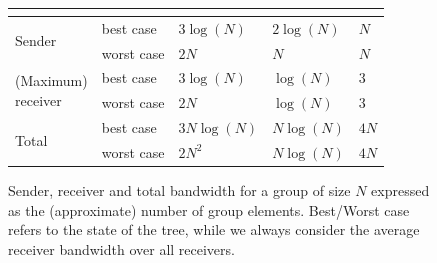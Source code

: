 \begin{figure}[!p]
\begin{minipage}[t]{.48\textwidth}
{	}
	\label{tab:plots}
  \end{minipage}
  \hfill
  \begin{minipage}[t]{.48\textwidth}
    \centering\vspace*{-9.5cm}
    \begin{minipage}[t]{\linewidth}
    	\begin{tabular}{|l|l|l|l|l|}
    		\hline
    		\multicolumn{2}{|c|}{}& \protITK & \saik & \protCMPKE \\
    		\hline
    		\multirow{2}{*}{Sender} 
    		& best case & $3\log(N)$ & $2\log(N)$ & $N$ \\\cline{2-5}
    		& worst case &$2N$ & $N$ & $N$ \\\hline
    		\multirow{2}{*}{\parbox{1.5cm}{(Maximum)\\receiver}} 
    		& best case & $3\log(N)$ & $\log(N)$&  $3$ \\\cline{2-5}
    		& worst case & $2N$ & $\log(N)$ & $3$ \\ \hline
            \multirow{2}{*}{Total}
            & best case & $3N\log(N)$ & $N\log(N)$ & $4N $ \\\cline{2-5}
            & worst case & $2N^2$ & $N\log(N)$ & $4N$ \\
    		\hline
    	\end{tabular}
    \caption{
    	Sender, receiver and total bandwidth for a group of size $N$ expressed as the (approximate) number of group
        elements. Best/Worst case refers to the state of the tree, while we always consider the average receiver
        bandwidth over all receivers.
    }\label{fig:bandwidth2}
  \end{minipage}



\end{minipage}
\end{figure}
